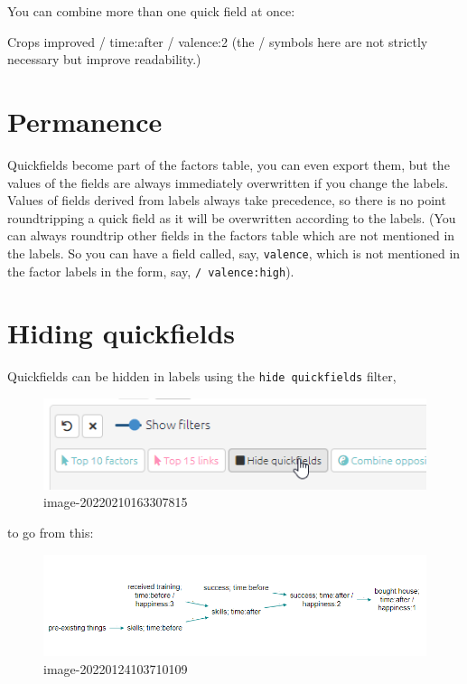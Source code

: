 \documentclass[
]{book}
\begin{document}
You can combine more than one quick field at once:

Crops improved / time:after / valence:2 (the / symbols here are not strictly necessary but improve readability.)

\hypertarget{permanence}{%
\section{Permanence}\label{permanence}}

Quickfields become part of the factors table, you can even export them, but the values of the fields are always immediately overwritten if you change the labels. Values of fields derived from labels always take precedence, so there is no point roundtripping a quick field as it will be overwritten according to the labels. (You can always roundtrip other fields in the factors table which are not mentioned in the labels. So you can have a field called, say, \texttt{valence}, which is not mentioned in the factor labels in the form, say, \texttt{/\ valence:high}).

\hypertarget{xhiding-quickfields}{%
\section{Hiding quickfields}\label{xhiding-quickfields}}

Quickfields can be hidden in labels using the \texttt{hide\ quickfields} filter,

\begin{figure}
\centering
\includegraphics{_assets/image-20220210163307815.png}
\caption{image-20220210163307815}
\end{figure}

to go from this:

\begin{figure}
\centering
\includegraphics[width=6.77083in,height=\textheight]{_assets/image-20220124103710109.png}
\caption{image-20220124103710109}
\end{figure}
\end{document}
